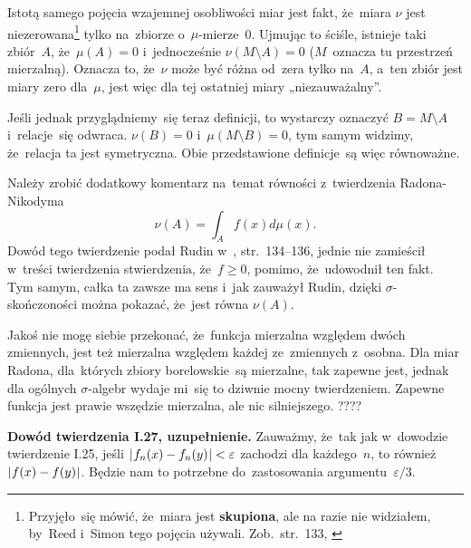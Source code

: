 \documentclass[a4paper,11pt]{article}
\numberwithin{equation}{section}
\begin{document}
Istotą samego pojęcia wzajemnej osobliwości miar jest fakt, że~miara
$\nu$ jest niezerowana\footnote{Przyjęło~się mówić, że~miara jest
  \textbf{skupiona}, ale na razie nie widziałem, by~Reed i~Simon tego
  pojęcia używali. Zob.~str.~133, \cite{Rudin-Analiza-rzeczywista-i-zespolona-Pub-1986}} tylko na~zbiorze
o~$\mu$-mierze~0. Ujmując to ściśle, istnieje taki zbiór~$A$,
że~$\mu( A ) = 0$ i~jednocześnie $\nu( M \setminus A ) = 0$ ($M$~oznacza
tu przestrzeń mierzalną). Oznacza to, że~$\nu$ może być różna od~zera
tylko na~$A$, a~ten zbiór jest miary zero dla~$\mu$, jest więc dla tej
ostatniej miary „niezauważalny”.

Jeśli jednak przyglądniemy~się teraz definicji, to wystarczy oznaczyć
$B = M \setminus A$ i~relacje~się odwraca. $\nu( B ) = 0$
i~$\mu( M \setminus B ) = 0$, tym samym widzimy, że~relacja ta jest
symetryczna. Obie przedstawione definicje~są więc równoważne.

\VerSpaceFour





\noindent
{} Należy zrobić dodatkowy komentarz na~temat równości
z~twierdzenia Radona-Nikodyma
\begin{equation}
  \label{eq:RS-Vol-I-s01-15}
  \nu( A ) = \int_{ A } f( x ) d\mu( x ).
\end{equation}
Dowód tego twierdzenie podał Rudin w~\cite{Rudin-Analiza-rzeczywista-i-zespolona-Pub-1986}, str.~134--136,
jednie nie zamieścił w~treści twierdzenia stwierdzenia, że~$f \geq 0$,
pomimo, że~udowodnił ten fakt. Tym samym, całka ta zawsze ma sens
i~jak zauważył Rudin, dzięki $\sigma$-skończoności można
pokazać, że~jest równa $\nu( A )$. %

\VerSpaceFour





\noindent
{} Jakoś nie mogę siebie przekonać, że~funkcja mierzalna
względem dwóch zmiennych, jest też mierzalna względem każdej
ze~zmiennych z~osobna. Dla miar Radona, dla~których zbiory
borelowskie~są mierzalne, tak zapewne jest, jednak dla ogólnych
$\sigma$-algebr wydaje mi~się to dziwnie mocny twierdzeniem.
Zapewne funkcja jest prawie wszędzie mierzalna, ale nic silniejszego.
????

\VerSpaceFour





\noindent
{} \textbf{Dowód twierdzenia I.27, uzupełnienie.} Zauważmy,
że~tak jak w~dowodzie twierdzenie I.25, jeśli
$| \hspace{0.05em}  f_{ n }( x ) - f_{ n }( y )  \hspace{0.05em} | < \varepsilon$ zachodzi dla
każdego~$n$, to również $| \hspace{0.05em}  f( x ) - f( y )  \hspace{0.05em} |$. Będzie nam to
potrzebne do~zastosowania argumentu~$\varepsilon / 3$. %
\end{document}
